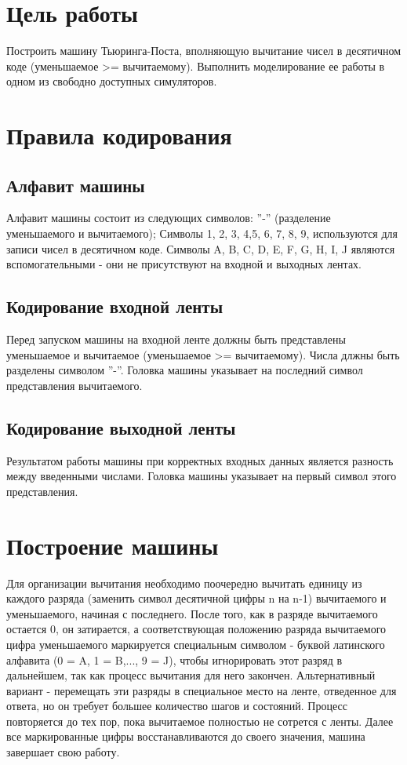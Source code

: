 






\section{Цель работы}
Построить машину Тьюринга-Поста, вполняющую вычитание чисел в десятичном коде (уменьшаемое >= вычитаемому). Выполнить моделирование ее работы в одном из свободно доступных симуляторов. 

\section{Правила кодирования}

\subsection{Алфавит машины}
Алфавит машины состоит из следующих символов: ''-'' (разделение уменьшаемого и вычитаемого); Символы 1, 2, 3, 4,5, 6, 7, 8, 9,  используются для записи чисел в десятичном коде. Символы A, B, C, D, E, F, G, H, I, J являются вспомогательными - они не присутствуют на входной и выходных лентах.

\subsection{Кодирование входной ленты}
Перед запуском машины на входной ленте должны быть представлены уменьшаемое и вычитаемое (уменьшаемое >= вычитаемому). Числа длжны быть разделены символом ''-''. Головка машины указывает на последний символ представления вычитаемого.

\subsection{Кодирование выходной ленты}
Результатом работы машины при корректных входных данных является разность между введенными числами. Головка машины указывает на первый символ этого представления.

\section{Построение машины}
Для организации вычитания необходимо поочередно вычитать единицу из каждого разряда (заменить символ десятичной цифры n на n-1) вычитаемого и уменьшаемого, начиная с последнего. После того, как в разряде вычитаемого остается 0, он затирается, а соответствующая положению разряда вычитаемого цифра уменьшаемого маркируется специальным символом - буквой латинского алфавита (0 = A, 1 = B,..., 9 = J), чтобы игнорировать этот разряд в дальнейшем, так как процесс вычитания для него закончен. Альтернативный вариант - перемещать эти разряды в специальное место на ленте, отведенное для ответа, но он требует большее количество шагов и состояний. Процесс повторяется до тех пор, пока вычитаемое полностью не сотрется с ленты. Далее все маркированные цифры восстанавливаются до своего значения, машина завершает свою работу.

